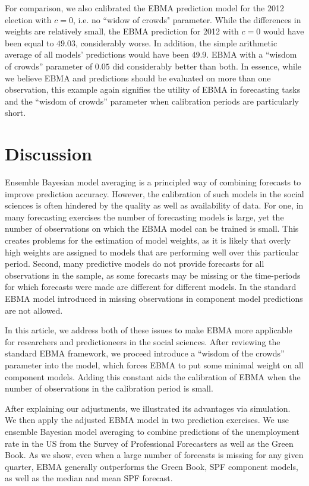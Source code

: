 \documentclass[12pt,fullpage,endnotes]{article}
\begin{document}
For comparison, we also calibrated the EBMA prediction model for the 2012 election with $c=0$, i.e. no ``widow of crowds" parameter. While the differences in weights are relatively small, the EBMA prediction for 2012 with $c=0$ would have been equal to $49.03$, considerably worse. In addition, the simple arithmetic average of all models' predictions would have been 49.9. EBMA with a ``wisdom of crowds'' parameter of $0.05$ did considerably better than both. In essence, while we believe EBMA and predictions should be evaluated on more than one observation, this example again signifies the utility of EBMA in forecasting tasks and the ``wisdom of crowds'' parameter when calibration periods are particularly short. 


\section{Discussion} 
Ensemble Bayesian model averaging is a principled way of combining
forecasts to improve prediction accuracy. However, the calibration of
such models in the social sciences is often hindered by the quality as
well as availability of data. For one, in many forecasting exercises
the number of forecasting models is large, yet the number of
observations on which the EBMA model can be trained is small. This
creates problems for the estimation of model weights, as it is likely
that overly high weights are assigned to models that are performing
well over this particular period. Second, many predictive models do
not provide forecasts for all observations in the sample, as some
forecasts may be missing or the time-periods for which forecasts were
made are different for different models. In the standard EBMA model
introduced in \citet{mhw:2012} missing observations in component model
predictions are not allowed.

In this article, we address both of these issues to make EBMA more
applicable for researchers and predictioneers in the social
sciences. After reviewing the standard EBMA framework, we proceed
introduce a ``wisdom of the crowds'' parameter into the model, which
forces EBMA to put some minimal weight on all component models. Adding
this constant aids the calibration of EBMA when the number of
observations in the calibration period is small.

After explaining our adjustments, we illustrated its advantages via
simulation.  We then apply the adjusted EBMA model in two prediction
exercises. We use ensemble Bayesian model averaging to combine
predictions of the unemployment rate in the US from the Survey of
Professional Forecasters as well as the Green Book. As we show, even
when a large number of forecasts is missing for any given quarter,
EBMA generally outperforms the Green Book, SPF component models, as
well as the median and mean SPF forecast.
\end{document}
